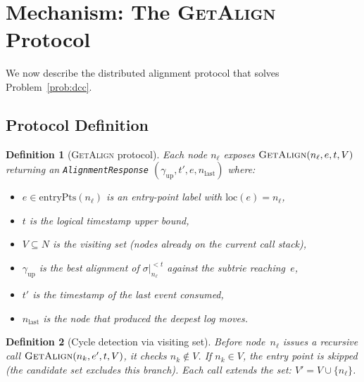 \documentclass[11pt,a4paper]{article}
\newtheorem{definition}{Definition}
\newcommand{\loc}{\mathrm{loc}}
\newcommand{\Nodes}{N}
\newcommand{\alignment}{\gamma}
\newcommand{\trace}{\sigma}
\newcommand{\ep}{\mathrm{entryPts}}
\newcommand{\GA}{\textsc{GetAlign}}
\begin{document}
\section{Mechanism: The \GA{} Protocol}
\label{sec:mechanism}

We now describe the distributed alignment protocol that solves
Problem~\ref{prob:dcc}.

\subsection{Protocol Definition}

\begin{definition}[\GA{} protocol]\label{def:get-alignment}
  Each node $n_\ell$ exposes
  $\GA(n_\ell, e, t, V)$
  returning an \texttt{AlignmentResponse}
  $(\alignment_{\mathrm{up}}, t', e, n_{\mathrm{last}})$ where:
  \begin{itemize}
    \item $e \in \ep(n_\ell)$ is an entry-point label with
          $\loc(e) = n_\ell$,
    \item $t$ is the logical timestamp upper bound,
    \item $V \subseteq \Nodes$ is the \emph{visiting set}
          (nodes already on the current call stack),
    \item $\alignment_{\mathrm{up}}$ is the best alignment of
          $\trace|_{n_\ell}^{< t}$ against the subtrie reaching~$e$,
    \item $t'$ is the timestamp of the last event consumed,
    \item $n_{\mathrm{last}}$ is the node that produced the deepest
          log moves.
  \end{itemize}
\end{definition}

\begin{definition}[Cycle detection via visiting set]%
  \label{def:cycle-detection}
  Before node~$n_\ell$ issues a recursive call
  $\GA(n_k, e', t, V)$, it checks $n_k \notin V$.
  If $n_k \in V$, the entry point is skipped (the candidate set
  excludes this branch).  Each call extends the set:
  $V' = V \cup \{n_\ell\}$.
\end{definition}
\end{document}
